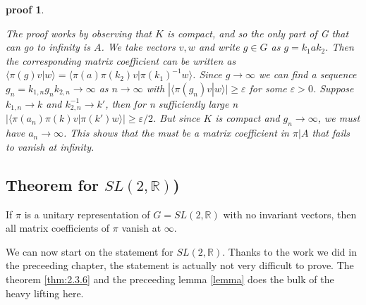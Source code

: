 \documentclass[
  12pt
]{article}
\theoremstyle{break}
\theoremstyle{plain}
\newtheorem*{pf}{proof}
\newcommand{\sltr}{\ensuremath{SL(2, \mathbb{R})}}
\begin{document}
  \begin{pf}\label{pf:lemma}

  The proof works by observing that $K$ is compact, and so the only part
  of G that can go to infinity is $A$. We take vectors $v, w$ and
  write $g \in G$ as $g = k_1 a k_2$. Then the corresponding matrix
  coefficient can be written as
  $\langle \pi(g)v|w \rangle = \langle \pi(a) \pi(k_2) v | \pi(k_1)^{-1} w \rangle$.
  Since $g \rightarrow \infty$ we can find a sequence
  $g_n = k_{1,n} g_{n} k_{2,n} \rightarrow \infty$ as
  $n \rightarrow \infty$ with
  $|\langle \pi(g_n) v | w \rangle | \geq \varepsilon$ for some
  $\varepsilon > 0$. Suppose $k_{1,n} \rightarrow k$ and
  $k_{2,n}^{-1} \rightarrow k'$, then for n sufficiently large n
  $|\langle \pi(a_n)\pi(k)v | \pi(k') w \rangle | \geq \varepsilon/2$.
  But since $K$ is compact and $g_n \rightarrow \infty$, we must have
  $a_n \rightarrow \infty$. This shows that the must be a matrix
  coefficient in $\pi | A$ that fails to vanish at infinity.

  \end{pf}

  \hypertarget{theorem-for-sl2-r}{%
    \subsection{Theorem for \texorpdfstring{$SL(2, \mathbb{R})$}{SN(2, R)})}\label{theorem-for-sl2-r}}

  If $\pi$ is a unitary representation of $G = SL(2, \mathbb{R})$ with no
  invariant vectors, then all matrix coefficients of $\pi$ vanish at $\infty$.


  We can now start on the statement for \sltr. Thanks to the work we did in the
  preceeding chapter, the statement is actually not very difficult to prove. The
  theorem \ref{thm:2.3.6} and the preceeding lemma \ref{lemma} does the bulk of
  the heavy lifting here.
\end{document}
